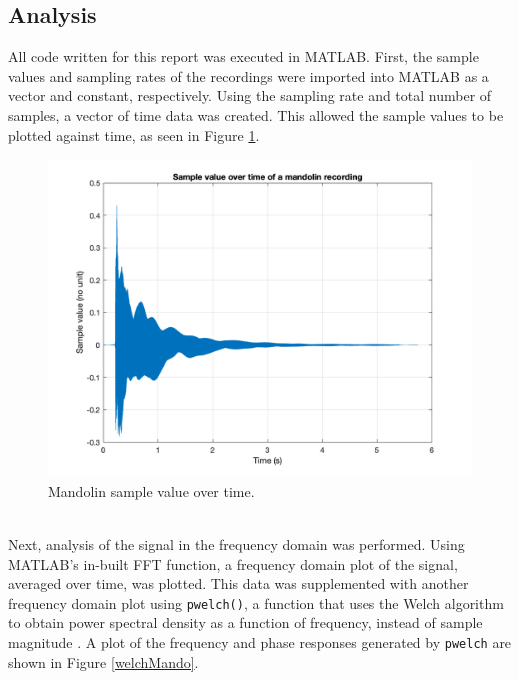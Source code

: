 \documentclass{article}
\begin{document}
    \subsection{Analysis}
        All code written for this report was executed in MATLAB.
        First, the sample values and sampling rates of the recordings were imported into MATLAB as a vector and constant, respectively.
        Using the sampling rate and total number of samples, a vector of time data was created.
        This allowed the sample values to be plotted against time, as seen in Figure \ref{timeDomainMando}.
        \begin{figure}[h]
            \includegraphics[scale=0.25]{images/timeDomain.png}%
            \centering
            \caption{Mandolin sample value over time.}
            \label{timeDomainMando}
        \end{figure}
        \\
        Next, analysis of the signal in the frequency domain was performed.
        Using MATLAB's in-built FFT function, a frequency domain plot of the signal, averaged over time, was plotted.
        This data was supplemented with another frequency domain plot using \texttt{pwelch()}, a function that uses the Welch algorithm to obtain power spectral density as a function of frequency, instead of sample magnitude \cite{solomon1991psd}.
        A plot of the frequency and phase responses generated by \texttt{pwelch} are shown in Figure \ref{welchMando}.
\end{document}
